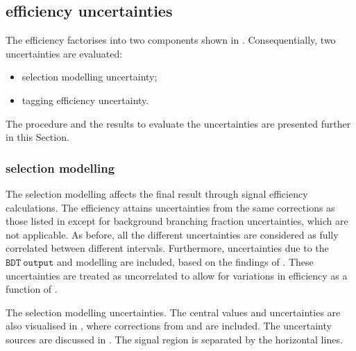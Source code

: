 \subsection{\texorpdfstring{\BtoXsgamma}{B->Xs gamma} efficiency uncertainties}\label{sec:signal_selection_uncertainties}

The \BtoXsgamma efficiency factorises into two components shown in .
Consequentially, two uncertainties are evaluated:
\begin{itemize}
    \item \BtoXsgamma selection modelling uncertainty;
    \item \BtoXsgamma tagging efficiency uncertainty.
\end{itemize}
The procedure and the results to evaluate the uncertainties are presented further in this Section.

\subsubsection{\texorpdfstring{\BtoXsgamma}{B->Xs gamma} selection modelling}

The \BtoXsgamma selection modelling affects the final result through signal efficiency calculations.
The efficiency attains uncertainties from the same corrections as those listed in  
except for background branching fraction uncertainties, which are not applicable.
As before, all the different uncertainties are considered as fully correlated between different \EB intervals.
Furthermore, uncertainties due to the $\mathtt{BDT~output}$ and \ZMVA modelling are included, based on the findings of .
These uncertainties are treated as uncorrelated to allow for variations in efficiency as a function of \EB.

\begin{table}[hbtp!]
    \centering
    \caption{\label{tab:signal_selection_uncertainties}
    The \BtoXsgamma selection modelling uncertainties.
    The central values and uncertainties are also visualised in ,
    where corrections from  and  are included.
    The uncertainty sources are discussed in .
    The signal region is separated by the horizontal lines.
    }
    
\end{table}


